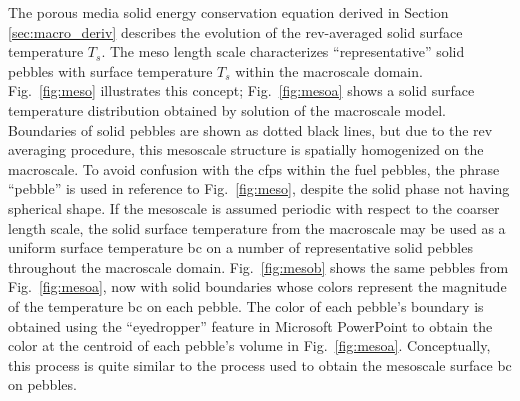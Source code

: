 The porous media solid energy conservation equation derived in Section \ref{sec:macro_deriv} describes the evolution of the \gls{rev}-averaged solid surface temperature \(T_s\). The meso length scale characterizes ``representative'' solid pebbles with surface temperature \(T_s\) within the macroscale domain. Fig.\ \ref{fig:meso} illustrates this concept; Fig.\ \ref{fig:mesoa} shows a solid surface temperature distribution obtained by solution of the macroscale model. Boundaries of solid pebbles are shown as dotted black lines, but due to the \gls{rev} averaging procedure, this mesoscale structure is spatially homogenized on the macroscale. To avoid confusion with the \glspl{cfp} within the fuel pebbles, the phrase ``pebble'' is used in reference to Fig.\ \ref{fig:meso}, despite the solid phase not having spherical shape. If the mesoscale is assumed periodic with respect to the coarser length scale, the solid surface temperature from the macroscale may be used as a uniform surface temperature \gls{bc} on a number of representative solid pebbles throughout the macroscale domain. Fig.\ \ref{fig:mesob} shows the same pebbles from Fig.\ \ref{fig:mesoa}, now with solid boundaries whose colors represent the magnitude of the temperature \gls{bc} on each pebble. The color of each pebble's boundary is obtained using the ``eyedropper'' feature in Microsoft PowerPoint to obtain the color at the centroid of each pebble's volume in Fig.\ \ref{fig:mesoa}. Conceptually, this process is quite similar to the process used to obtain the mesoscale surface \gls{bc} on pebbles.


